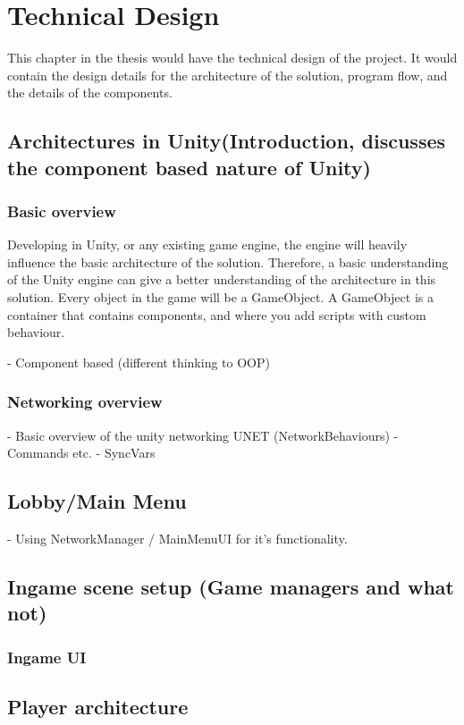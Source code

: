\chapter{Technical Design}
\label{chap:technical}

This chapter in the thesis would have the technical design of the project.  It would contain the design details for the architecture of the solution, program flow, and the details of the components.

\section{Architectures in Unity(Introduction, discusses the component based nature of Unity)}
\subsection{Basic overview}
Developing in Unity, or any existing game engine, the engine will heavily influence the basic architecture of the solution. Therefore, a basic understanding of the Unity engine can give a better understanding of the architecture in this solution.
Every object in the game will be a GameObject. A GameObject is a container that contains components, and where you add scripts with custom behaviour.

    - Component based (different thinking to OOP)

\subsection{Networking overview}
    - Basic overview of the unity networking UNET (NetworkBehaviours)
    - Commands etc.
    - SyncVars

\section{Lobby/Main Menu}
    - Using NetworkManager / MainMenuUI for it's functionality.

\section{Ingame scene setup (Game managers and what not)}
\subsection{Ingame UI}

\section{Player architecture}

